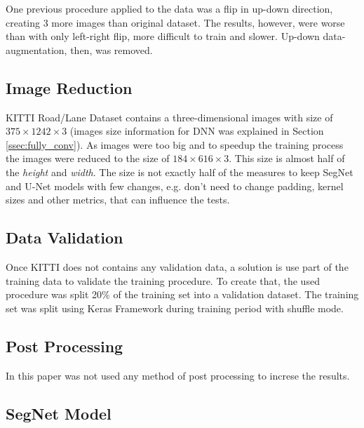 \documentclass[10pt,twocolumn,letterpaper]{article}
\begin{document}
One previous procedure applied to the data was a flip in up-down direction, creating 3 more images than original dataset. The results, however, were worse than with only left-right flip, more difficult to train and slower. Up-down data-augmentation, then, was removed.

\subsection{Image Reduction} \label{ssec:image_reduction}

KITTI Road/Lane Dataset contains a three-dimensional images with size of $375 \times 1242 \times 3$ (images size information for DNN was explained in Section \ref{ssec:fully_conv}). As images were too big and to speedup the training process the images were reduced to the size of $ 184 \times 616 \times 3$. This size is almost half of the \textit{height} and \textit{width}. The size is not exactly half of the measures to keep SegNet and U-Net models with few changes, e.g. don't need to change padding, kernel sizes and other metrics, that can influence the tests.

\subsection{Data Validation} \label{ssec:data_validation}

Once KITTI does not contains any validation data, a solution is use part of the training data to validate the training procedure. To create that, the used procedure was split 20\% of the training set into a validation dataset. The training set was split using Keras Framework during training period with shuffle mode.

\subsection{Post Processing} \label{ssec:post_processing}

In this paper was not used any method of post processing to increse the results.

\subsection{SegNet Model} \label{ssec:segnet_model}
\end{document}
